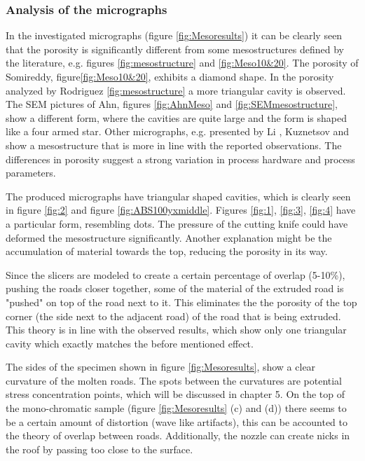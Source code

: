 \subsubsection{Analysis of the micrographs}
In the investigated micrographs (figure \ref{fig:Mesoresults}) it can be clearly seen that the porosity is significantly different from some mesostructures defined by the literature, e.g. figures \ref{fig:mesostructure} and \ref{fig:Meso10&20}. The porosity of Somireddy, figure\ref{fig:Meso10&20}, exhibits a diamond shape. In the porosity analyzed by Rodriguez \ref{fig:mesostructure} a more triangular cavity is observed. The SEM pictures of Ahn, figures \ref{fig:AhnMeso} and \ref{fig:SEMmesostructure}, show a different form, where the cavities are quite large and the form is shaped like a four armed star. Other micrographs, e.g. presented by Li \cite{Li2002CompositeProperties}, Kuznetsov \cite{Kuznetsov2018StrengthProcess} and \cite{TronvollTheApproach} show a mesostructure that is more in line with the reported observations. The differences in porosity suggest a strong variation in process hardware and process parameters.

The produced micrographs have triangular shaped cavities, which is clearly seen in figure \ref{fig:2} and figure \ref{fig:ABS100yxmiddle}. Figures \ref{fig:1}, \ref{fig:3}, \ref{fig:4} have a particular form, resembling dots. The pressure of the cutting knife could have deformed the mesostructure significantly. Another explanation might be the accumulation of material towards the top, reducing the porosity in its way. 

Since the slicers are  modeled to create a certain percentage of overlap (5-10\%), pushing the roads closer together, some of the material of the extruded road is "pushed" on top of the road next to it. This eliminates the the porosity of the top corner (the side next to the adjacent road) of the road that is being extruded. This theory is in line with the observed results, which show only one triangular cavity which exactly matches the before mentioned effect. 

The sides of the specimen shown in figure \ref{fig:Mesoresults}, show a clear curvature of the molten roads. The spots between the curvatures are potential stress concentration points, which will be discussed in chapter 5.
On the top of the mono-chromatic sample (figure \ref{fig:Mesoresults} (c) and (d)) there seems to be a certain amount of distortion (wave like artifacts), this can be accounted to the theory of overlap between roads. Additionally, the nozzle can create nicks in the roof by passing too close to the surface.

